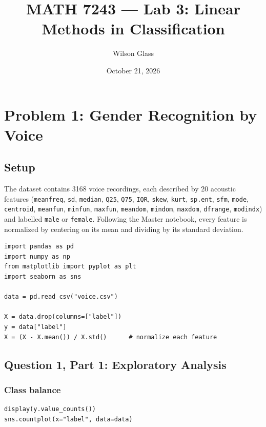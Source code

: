 \documentclass[11pt]{article}
\title{MATH 7243 --- Lab 3: Linear Methods in Classification}
\author{Wilson Glass}
\date{October 21, 2026}
\begin{document}
\maketitle

\section*{Problem 1: Gender Recognition by Voice}

\subsection*{Setup}

The dataset contains 3168 voice recordings, each described by 20 acoustic features
(\texttt{meanfreq}, \texttt{sd}, \texttt{median}, \texttt{Q25}, \texttt{Q75},
\texttt{IQR}, \texttt{skew}, \texttt{kurt}, \texttt{sp.ent}, \texttt{sfm}, \texttt{mode},
\texttt{centroid}, \texttt{meanfun}, \texttt{minfun}, \texttt{maxfun}, \texttt{meandom},
\texttt{mindom}, \texttt{maxdom}, \texttt{dfrange}, \texttt{modindx}) and labelled
\texttt{male} or \texttt{female}. Following the Master notebook, every feature is
normalized by centering on its mean and dividing by its standard deviation.

\begin{lstlisting}
import pandas as pd
import numpy as np
from matplotlib import pyplot as plt
import seaborn as sns

data = pd.read_csv("voice.csv")

X = data.drop(columns=["label"])
y = data["label"]
X = (X - X.mean()) / X.std()      # normalize each feature
\end{lstlisting}

\subsection*{Question 1, Part 1: Exploratory Analysis}

\subsubsection*{Class balance}

\begin{lstlisting}
display(y.value_counts())
sns.countplot(x="label", data=data)
\end{lstlisting}
\end{document}
